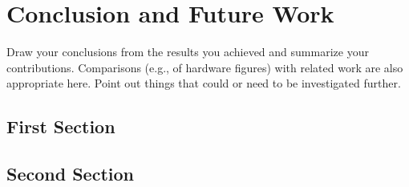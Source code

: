 
\chapter{Conclusion and Future Work}
Draw your conclusions from the results you achieved and summarize your
contributions. Comparisons (e.g., of hardware figures) with related
work are also appropriate here. Point out things that could or need to
be investigated further.

\section{First Section}


\section{Second Section}



